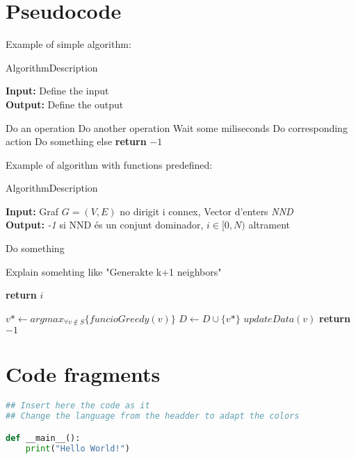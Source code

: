 \clearpage
\section{Pseudocode}

Example of simple algorithm:
\begin{algorithm}[H]
  \caption{AlgorithmDescription}
  \label{alg:label}
  \textbf{Input:} Define the input\\
  \textbf{Output:} Define the output

  \begin{algorithmic}[1]
    \STATE Do an operation
    \STATE Do another operation
    \STATE Wait some miliseconds
    \STATE Do corresponding action
    \ENDIF
    \STATE Do something else
    \STATE \textbf{return} $-1$
  \end{algorithmic}
\end{algorithm}

Example of algorithm with functions predefined:

\begin{algorithm}[H]
  \caption{AlgorithmDescription}
  \label{alg:label}
  \textbf{Input:} Graf $G = (V, E)$ no dirigit i connex, Vector
  d'enters \emph{NND}\\
  \textbf{Output:} \emph{-1} si NND és un conjunt dominador, $i \in
  [0, N)$ altrament
  \begin{algorithmic}[1]
    \FOR{each $i \in [0, N)$}
    \STATE Do something
    \ENDFOR

    \STATE Explain somehting like "Generakte k+1 neighbors"

    \STATE \textbf{return} $i$
    \ENDIF

    \STATE $v* \leftarrow arg max_{\forall v \not\in S } \{funcioGreedy(v)\}$
    \STATE $D \leftarrow  D  \cup  \{v*\}$
    \STATE $updateData(v)$
    \ENDWHILE
    \STATE \textbf{return} $-1$
  \end{algorithmic}
\end{algorithm}

\section{Code fragments}
\begin{lstlisting}[language=Python, caption={CaptionPythonCode}, label={code:label}]
## Insert here the code as it
## Change the language from the headder to adapt the colors

def __main__():
    print("Hello World!")
\end{lstlisting}
